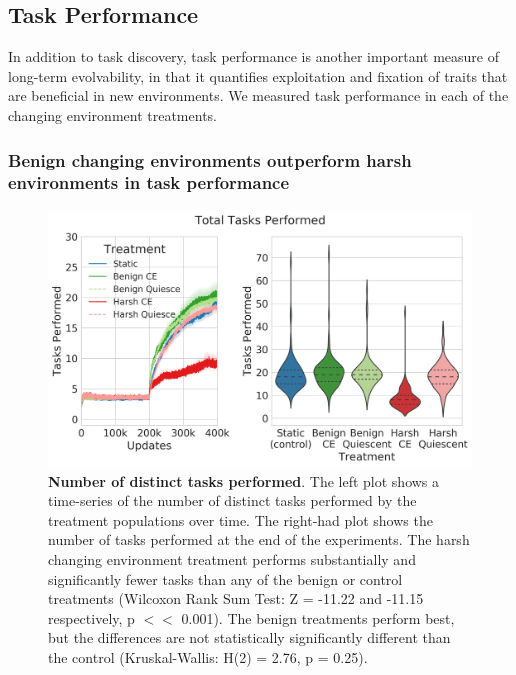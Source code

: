\documentclass[10pt,letterpaper,final]{article}
\begin{document}







\subsection*{Task Performance}
In addition to task discovery, task performance is another important measure of long-term evolvability, in that it quantifies exploitation and fixation of traits that are beneficial in new environments. We measured task performance in each of the changing environment treatments.

\subsubsection*{Benign changing environments outperform harsh environments in task performance}

	\begin{figure}[!h]
	\includegraphics[width=0.95\columnwidth]{figures/LTE/lte-simple-task_performance.png}
	\caption{\textbf{Number of distinct tasks performed}. The left plot shows a time-series of the number of distinct tasks performed by the treatment populations over time. The right-had plot shows the number of tasks performed at the end of the experiments. The harsh changing environment treatment performs substantially and significantly fewer tasks than any of the benign or control treatments (Wilcoxon Rank Sum Test: Z = -11.22 and -11.15 respectively, p $<<$ 0.001). The benign treatments perform best, but the differences are not statistically significantly different than the control (Kruskal-Wallis: H(2) = 2.76, p = 0.25). %
	}
	\label{fig:lte-simple-task_performance}
	\end{figure}  
\end{document}
